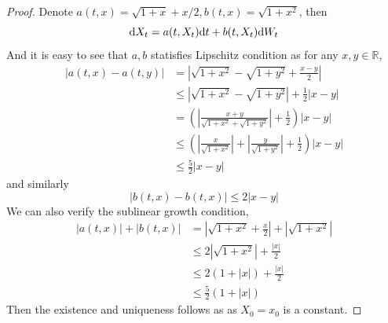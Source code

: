 \documentclass{homework}
\begin{document}
    \problem
    \begin{subproblem}
        \item
        \begin{proof}
            Denote $a(t,x)=\sqrt{1+x}+x/2,b(t,x)=\sqrt{1+x^2}$, then
            \[\mathrm d X_t=a(t,X_t)\mathrm d t+b(t,X_t)\mathrm d W_t\]
            And it is easy to see that $a,b$ statisfies Lipschitz condition as
            for any $x,y\in\mathbb R$,
            \[\begin{aligned}
                |a(t,x)-a(t,y)|
                &=\left|\sqrt{1+x^2}-\sqrt{1+y^2}+\frac{x-y}{2}\right|\\
                &\leq\left|\sqrt{1+x^2}-\sqrt{1+y^2}\right|+\frac{1}{2}|x-y|\\
                &=\left(\left|\frac{x+y}{\sqrt{1+x^2}+\sqrt{1+y^2}}\right|+\frac{1}{2}\right)|x-y|\\
                &\leq\left(\left|\frac{x}{\sqrt{1+x^2}}\right|
                +\left|\frac{y}{\sqrt{1+y^2}}\right|+\frac{1}{2}\right)|x-y|\\
                &\leq\frac{5}{2}|x-y|
            \end{aligned}\]
            and similarly
            \[|b(t,x)-b(t,x)|\leq 2|x-y|\]
            We can also verify the sublinear growth condition,
            \[\begin{aligned}
                |a(t,x)|+|b(t,x)|&=\left|\sqrt{1+x^2}+\frac{x}{2}\right|
                +\left|\sqrt{1+x^2}\right|\\
                &\leq 2\left|\sqrt{1+x^2}\right|+\frac{|x|}{2}\\
                &\leq 2(1+|x|)+\frac{|x|}{2}\\
                &\leq \frac{5}{2}(1+|x|)
            \end{aligned}\]
            Then the existence and uniqueness follows as
            as $X_0=x_0$ is a constant.
        \end{proof}


\end{subproblem}
\end{document}
